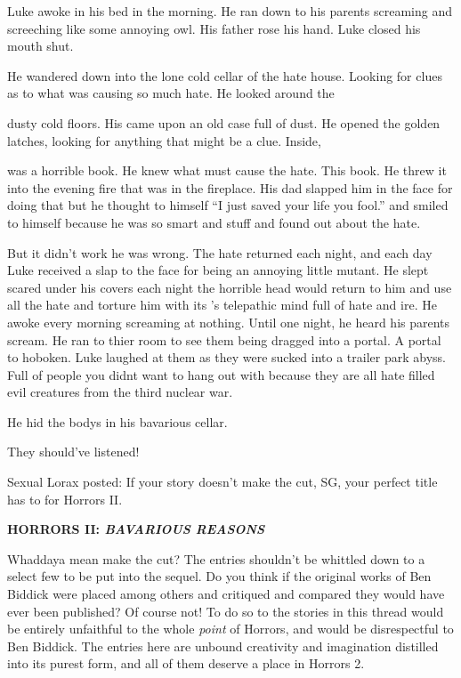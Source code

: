 Luke awoke in his bed in the morning. He ran down to his parents
screaming and screeching like some annoying owl. His father rose
his hand. Luke closed his mouth shut.



He wandered down into the lone cold cellar of the hate house.
Looking for clues as to what was causing so much hate. He looked
around the

dusty cold floors. His came upon an old case full of dust. He
opened the golden latches, looking for anything that might be a
clue. Inside,

was a horrible book. He knew what must cause the hate. This book.
He threw it into the evening fire that was in the fireplace. His
dad slapped him in the face for doing that but he thought to
himself ``I just saved your life you fool.'' and smiled to himself
because he was so smart and stuff and found out about the
hate.



But it didn't work he was wrong. The hate returned each night, and
each day Luke received a slap to the face for being an annoying
little mutant. He slept scared under his covers each night the
horrible head would return to him and use all the hate and torture
him with its 's telepathic mind full of hate and ire. He awoke
every morning screaming at nothing. Until one night, he heard his
parents scream. He ran to thier room to see them being dragged into
a portal. A portal to hoboken. Luke laughed at them as they were
sucked into a trailer park abyss. Full of people you didnt want to
hang out with because they are all hate filled evil creatures from
the third nuclear war.



He hid the bodys in his bavarious cellar.



They should've listened! 
 






Sexual Lorax posted:
If your story doesn't make the cut, SG, your perfect
title has to for Horrors II.



{\bf HORRORS II: {\em BAVARIOUS
REASONS}}




Whaddaya mean make the cut? The entries shouldn't be whittled down
to a select few to be put into the sequel. Do you think if the
original works of Ben Biddick were placed among others and
critiqued and compared they would have ever been published? Of
course not! To do so to the stories in this thread would be
entirely unfaithful to the whole {\em point} of Horrors, and would
be disrespectful to Ben Biddick. The entries here are unbound
creativity and imagination distilled into its purest form, and all
of them deserve a place in Horrors 2. 


